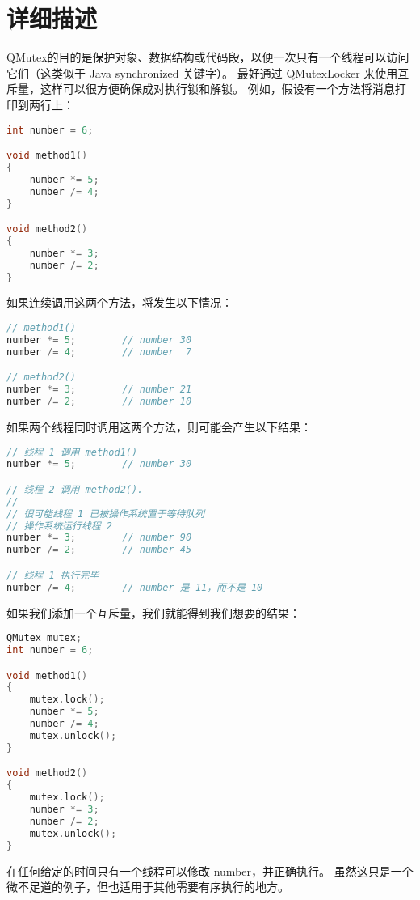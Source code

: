 \section{详细描述}

QMutex的目的是保护对象、数据结构或代码段，以便一次只有一个线程可以访问它们（这类似于 Java synchronized 关键字）。
最好通过 QMutexLocker 来使用互斥量，这样可以很方便确保成对执行锁和解锁。
例如，假设有一个方法将消息打印到两行上：

\begin{lstlisting}[language=C++]
int number = 6;

void method1()
{
    number *= 5;
    number /= 4;
}

void method2()
{
    number *= 3;
    number /= 2;
}
\end{lstlisting}

如果连续调用这两个方法，将发生以下情况：

\begin{lstlisting}[language=C++]
// method1()
number *= 5;        // number 30
number /= 4;        // number  7

// method2()
number *= 3;        // number 21
number /= 2;        // number 10
\end{lstlisting}

如果两个线程同时调用这两个方法，则可能会产生以下结果：

\begin{lstlisting}[language=C++]
// 线程 1 调用 method1()
number *= 5;        // number 30

// 线程 2 调用 method2().
//
// 很可能线程 1 已被操作系统置于等待队列
// 操作系统运行线程 2
number *= 3;        // number 90
number /= 2;        // number 45

// 线程 1 执行完毕
number /= 4;        // number 是 11，而不是 10
\end{lstlisting}

如果我们添加一个互斥量，我们就能得到我们想要的结果：

\begin{lstlisting}[language=C++]
QMutex mutex;
int number = 6;

void method1()
{
    mutex.lock();
    number *= 5;
    number /= 4;
    mutex.unlock();
}

void method2()
{
    mutex.lock();
    number *= 3;
    number /= 2;
    mutex.unlock();
}
\end{lstlisting}

在任何给定的时间只有一个线程可以修改 number，并正确执行。
虽然这只是一个微不足道的例子，但也适用于其他需要有序执行的地方。

